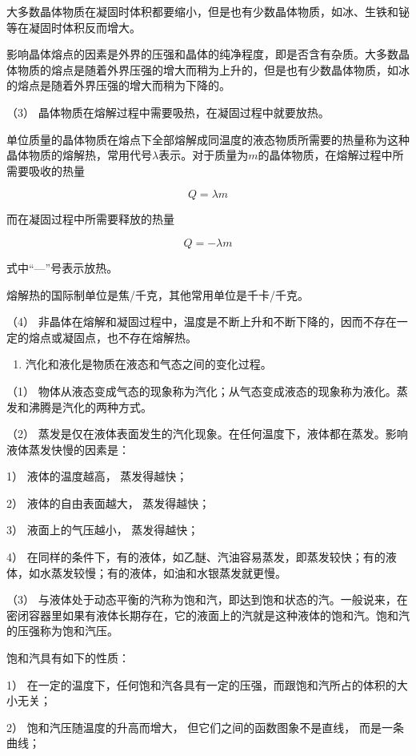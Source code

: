 大多数晶体物质在凝固时体积都要缩小，但是也有少数晶体物质，如冰、生铁和铋等在凝固时体积反而增大。

影响晶体熔点的因素是外界的压强和晶体的纯净程度，即是否含有杂质。大多数晶体物质的熔点是随着外界压强的增大而稍为上升的，但是也有少数晶体物质，如冰的熔点是随着外界压强的增大而稍为下降的。

（3） 晶体物质在熔解过程中需要吸热，在凝固过程中就要放热。

单位质量的晶体物质在熔点下全部熔解成同温度的液态物质所需要的热量称为这种晶体物质的熔解热，常用代号\(\lambda\)表示。对于质量为\(m\)的晶体物质，在熔解过程中所需要吸收的热量

\[
Q = \lambda m
\]

而在凝固过程中所需要释放的热量

\[
Q = - \lambda m
\]

式中``---''号表示放热。

熔解热的国际制单位是焦/千克，其他常用单位是千卡/千克。

（4）
非晶体在熔解和凝固过程中，温度是不断上升和不断下降的，因而不存在一定的熔点或凝固点，也不存在熔解热。

\begin{enumerate}
\def\labelenumi{\arabic{enumi}.}
\setcounter{enumi}{1}
\tightlist
\item
  汽化和液化是物质在液态和气态之间的变化过程。
\end{enumerate}

（1）
物体从液态变成气态的现象称为汽化；从气态变成液态的现象称为液化。蒸发和沸腾是汽化的两种方式。

（2）
蒸发是仅在液体表面发生的汽化现象。在任何温度下，液体都在蒸发。影响液体蒸发快慢的因素是：

1） 液体的温度越高， 蒸发得越快；

2） 液体的自由表面越大， 蒸发得越快；

3） 液面上的气压越小， 蒸发得越快；

4）
在同样的条件下，有的液体，如乙醚、汽油容易蒸发，即蒸发较快；有的液体，如水蒸发较慢；有的液体，如油和水银蒸发就更慢。

（3）
与液体处于动态平衡的汽称为饱和汽，即达到饱和状态的汽。一般说来，在密闭容器里如果有液体长期存在，它的液面上的汽就是这种液体的饱和汽。饱和汽的压强称为饱和汽压。

饱和汽具有如下的性质：

1）
在一定的温度下，任何饱和汽各具有一定的压强，而跟饱和汽所占的体积的大小无关；

2） 饱和汽压随温度的升高而增大， 但它们之间的函数图象不是直线，
而是一条曲线；

